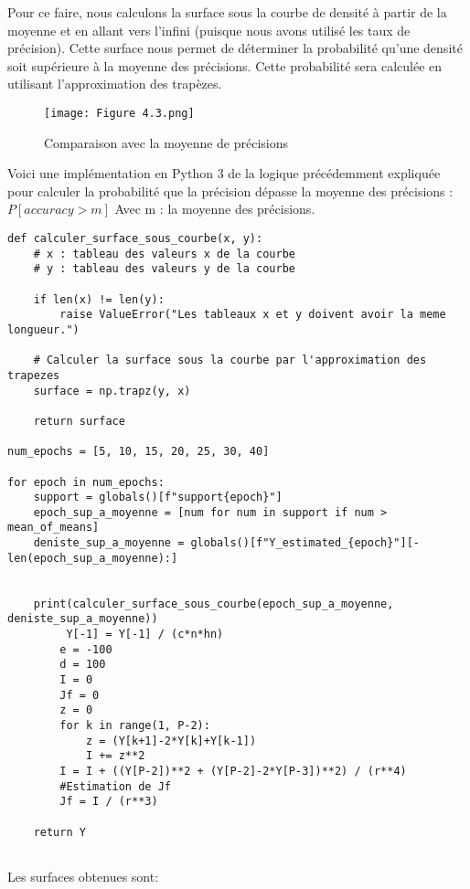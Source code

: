 Pour ce faire, nous calculons la surface sous la courbe de densité à partir de la moyenne et en allant vers l'infini (puisque nous avons utilisé les taux de précision). Cette surface nous permet de déterminer la probabilité qu'une densité soit supérieure à la moyenne des précisions. Cette probabilité sera calculée en utilisant l'approximation des trapèzes.
\clearpage

\begin{figure}[!h]
  \centering
  \texttt{[image: Figure 4.3.png]}
  \caption{Comparaison avec la moyenne de précisions}
  \label{fig:Comparaison avec la moyenne de précisions}
\end{figure}
\clearpage
Voici une implémentation en Python 3 de la logique précédemment expliquée pour calculer la probabilité que la précision 
dépasse la moyenne des précisions : \\
$P[accuracy > m]$
\newline
Avec m : la moyenne des précisions.

\begin{lstlisting}
def calculer_surface_sous_courbe(x, y):
    # x : tableau des valeurs x de la courbe
    # y : tableau des valeurs y de la courbe

    if len(x) != len(y):
        raise ValueError("Les tableaux x et y doivent avoir la meme longueur.")

    # Calculer la surface sous la courbe par l'approximation des trapezes
    surface = np.trapz(y, x)

    return surface

num_epochs = [5, 10, 15, 20, 25, 30, 40]

for epoch in num_epochs:
    support = globals()[f"support{epoch}"] 
    epoch_sup_a_moyenne = [num for num in support if num > mean_of_means]
    deniste_sup_a_moyenne = globals()[f"Y_estimated_{epoch}"][-len(epoch_sup_a_moyenne):]

   
    print(calculer_surface_sous_courbe(epoch_sup_a_moyenne, deniste_sup_a_moyenne))
         Y[-1] = Y[-1] / (c*n*hn)
        e = -100
        d = 100
        I = 0
        Jf = 0
        z = 0
        for k in range(1, P-2):
            z = (Y[k+1]-2*Y[k]+Y[k-1])
            I += z**2
        I = I + ((Y[P-2])**2 + (Y[P-2]-2*Y[P-3])**2) / (r**4)
        #Estimation de Jf 
        Jf = I / (r**3)
        
    return Y


\end{lstlisting}
 \vspace{1cm}
 Les surfaces obtenues sont:
       \vspace{0.25cm}


